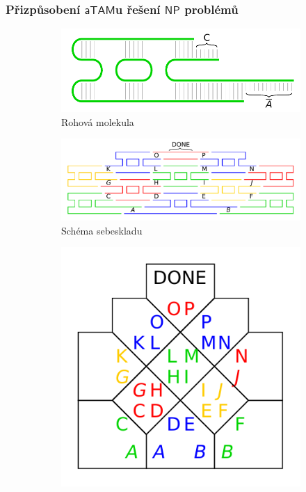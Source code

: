 \documentclass[10pt]{beamer}
\newcommand{\NP}{\mathsf{NP}}
\newcommand{\atam}{\mathsf{aTAM}}
\theoremstyle{definition}
\theoremstyle{remark}
\begin{document}
\begin{frame}
\frametitle{Přizpůsobení $\atam$u řešení $\NP$ problémů}
	\begin{figure}[H]
	\begin{center}
		\begin{subfigure}[b]{0.33\textwidth}
			\includegraphics[width=\textwidth]{../figures/tile_model/DNA_struct.pdf} %
			\caption{Rohová molekula}
		\end{subfigure}
		\begin{subfigure}[b]{0.65\textwidth}
			\includegraphics[width=\textwidth]{../figures/tile_model/DNA_assembly.pdf} %
			\caption{Schéma sebeskladu}
		\end{subfigure}
		\begin{subfigure}[b]{0.25\textwidth}
			\includegraphics[width=\textwidth]{../figures/tile_model/abstract_model.pdf} %

\end{subfigure}
\end{center}
\end{figure}
\end{frame}
\end{document}
